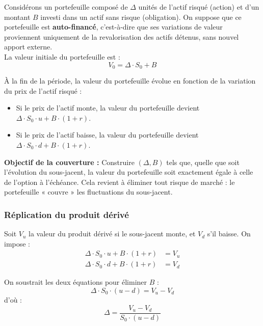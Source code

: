 \documentclass[12pt,a4paper]{article}
\begin{document}
Considérons un portefeuille composé de \(\Delta\) unités de l'actif risqué (action) et d'un montant \(B\) investi dans un actif sans risque (obligation). On suppose que ce portefeuille est \textbf{auto-financé}, c’est-à-dire que ses variations de valeur proviennent uniquement de la revalorisation des actifs détenus, sans nouvel apport externe.\\

La valeur initiale du portefeuille est :
\begin{equation}
\boxed{V_0 = \Delta \cdot S_0 + B}
\end{equation}

À la fin de la période, la valeur du portefeuille évolue en fonction de la variation du prix de l'actif risqué :

\begin{itemize}
    \item Si le prix de l'actif monte, la valeur du portefeuille devient \(\Delta \cdot S_0 \cdot u + B \cdot (1 + r)\).
    \item Si le prix de l'actif baisse, la valeur du portefeuille devient \(\Delta \cdot S_0 \cdot d + B \cdot (1 + r)\).
\end{itemize}

\noindent \textbf{Objectif de la couverture :} Construire \((\Delta, B)\) tels que, quelle que soit l’évolution du sous-jacent, la valeur du portefeuille soit exactement égale à celle de l’option à l’échéance. Cela revient à éliminer tout risque de marché : le portefeuille « couvre » les fluctuations du sous-jacent.

\subsubsection{Réplication du produit dérivé}

Soit \(V_u\) la valeur du produit dérivé si le sous-jacent monte, et \(V_d\) s’il baisse. On impose :
\begin{align}
\Delta \cdot S_0 \cdot u + B \cdot (1 + r) &= V_u \\
\Delta \cdot S_0 \cdot d + B \cdot (1 + r) &= V_d
\end{align}

On soustrait les deux équations pour éliminer \(B\) :
\[
\Delta \cdot S_0 \cdot (u - d) = V_u - V_d
\]
d'où :
\begin{equation}
\boxed{\Delta = \frac{V_u - V_d}{S_0 \cdot (u - d)}}
\end{equation}
\end{document}

